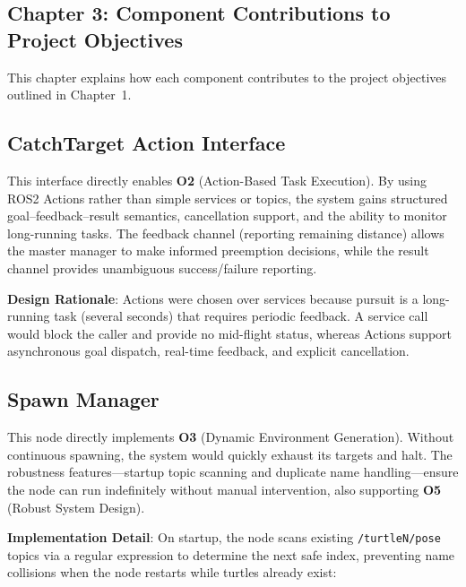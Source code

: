 \documentclass{article}
\begin{document}
\begin{homeworkProblem}[3]
\section{Chapter 3: Component Contributions to Project Objectives}

This chapter explains how each component contributes to the project objectives outlined in Chapter~1.

\subsection{CatchTarget Action Interface}

This interface directly enables \textbf{O2} (Action-Based Task Execution). By using ROS2 Actions rather than simple services or topics, the system gains structured goal--feedback--result semantics, cancellation support, and the ability to monitor long-running tasks. The feedback channel (reporting remaining distance) allows the master manager to make informed preemption decisions, while the result channel provides unambiguous success/failure reporting.

\textbf{Design Rationale}: Actions were chosen over services because pursuit is a long-running task (several seconds) that requires periodic feedback. A service call would block the caller and provide no mid-flight status, whereas Actions support asynchronous goal dispatch, real-time feedback, and explicit cancellation.

\subsection{Spawn Manager}

This node directly implements \textbf{O3} (Dynamic Environment Generation). Without continuous spawning, the system would quickly exhaust its targets and halt. The robustness features---startup topic scanning and duplicate name handling---ensure the node can run indefinitely without manual intervention, also supporting \textbf{O5} (Robust System Design).

\textbf{Implementation Detail}: On startup, the node scans existing \texttt{/turtleN/pose} topics via a regular expression to determine the next safe index, preventing name collisions when the node restarts while turtles already exist:


\end{homeworkProblem}
\end{document}
